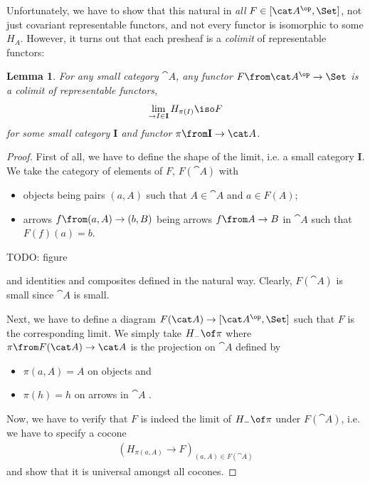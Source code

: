 \documentclass{article}
\newtheorem{lemma}{Lemma}
\begin{document}
Unfortunately, we have to show that this natural in \emph{all} $F\in[\cat A^\op,\Set]$, not just covariant representable functors, and not every functor is isomorphic to some $H_A$. However, it turns out that each presheaf is a \emph{colimit} of representable functors:

\begin{lemma}
  \label{lem:lim}
  For any small category $\cat A$, any functor $F\from\cat A^\op\to\Set$ is a colimit of representable functors,
  \begin{align*}
    \lim_{\to I\in\mathbf I} H_{\pi(I)}\iso F
  \end{align*}
  for some small category $\mathbf I$ and functor $\pi\from \mathbf I\to \cat A$.
\end{lemma}
\begin{proof}
  First of all, we have to define the shape of the limit, i.e. a small category $\mathbf I$. We take the category of elements of $F$, $F(\cat A)$ with
  \begin{itemize}
  \item objects being pairs $(a,A)$ such that $A\in\cat A$ and $a\in F(A)$;
  \item arrows $f\from(a,A)\to(b,B)$ being arrows $f\from A\to B$ in $\cat A$ such that $F(f)(a)=b$.
  \end{itemize}
  TODO: figure

  and identities and composites defined in the natural way. Clearly, $F(\cat A)$ is small since $\cat A$ is small.

  Next, we have to define a diagram $F(\cat A)\to[\cat A^\op,\Set]$ such that $F$ is the corresponding limit. We simply take $H_-\of\pi$ where $\pi\from F(\cat A)\to\cat A$ is the projection on $\cat A$ defined by 
  \begin{itemize}
  \item $\pi(a,A)=A$ on objects and
  \item $\pi(h)=h$ on arrows in $\cat A$ .
  \end{itemize}

  Now, we have to verify that $F$ is indeed the limit of $H_-\of\pi$ under $F(\cat A)$, i.e. we have to specify a cocone
  \begin{align*}
    (H_{\pi(a,A)}\to F)_{(a,A)\in F(\cat A)}
  \end{align*}
  and show that it is universal amongst all cocones.


\end{proof}
\end{document}
